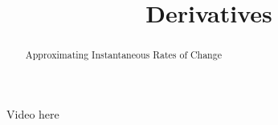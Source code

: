 \documentclass[handout]{ximera}
\title{Derivatives}
\begin{document}
\begin{abstract} Approximating Instantaneous Rates of Change %
\end{abstract}

\maketitle

Video here
\end{document}

